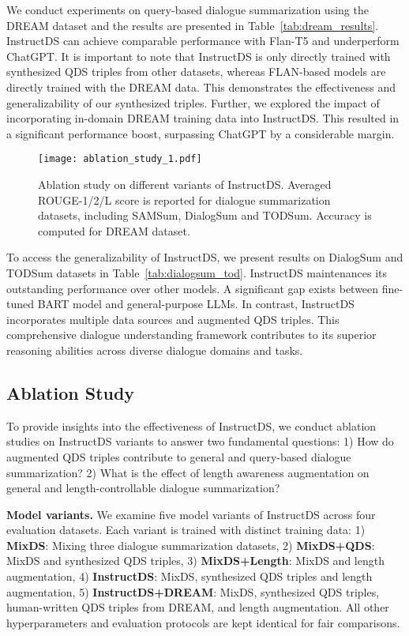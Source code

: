 \documentclass[11pt]{article}
\begin{document}
        We conduct experiments on query-based dialogue summarization using the DREAM dataset and the results are presented in Table~\ref{tab:dream_results}. InstructDS can achieve comparable performance with Flan-T5 and underperform ChatGPT. It is important to note that InstructDS is only directly trained with synthesized QDS triples from other datasets, whereas FLAN-based models are directly trained with the DREAM data. This demonstrates the effectiveness and generalizability of our synthesized triples. Further, we explored the impact of incorporating in-domain DREAM training data into InstructDS. This resulted in a significant performance boost, surpassing ChatGPT by a considerable margin.
        

\begin{figure*}[t]
        \centering
         \texttt{[image: ablation\_study\_1.pdf]}
        \caption{Ablation study on different variants of InstructDS. Averaged ROUGE-1/2/L score is reported for dialogue summarization datasets, including SAMSum, DialogSum and TODSum. Accuracy is computed for DREAM dataset.}
        \label{fig:ablation}
    \end{figure*}




        To access the generalizability of InstructDS, we present results on DialogSum and TODSum datasets in Table~\ref{tab:dialogsum_tod}. InstructDS maintenances its outstanding performance over other models.  
        A significant gap exists between fine-tuned BART model and general-purpose LLMs. In contrast, InstructDS incorporates multiple data sources and augmented QDS triples. This comprehensive dialogue understanding framework contributes to its superior reasoning abilities across diverse dialogue domains and tasks.


    \subsection{Ablation Study}
    \label{sec:ablation}

        To provide insights into the effectiveness of InstructDS, we conduct ablation studies on InstructDS variants to answer two fundamental questions: 1) How do augmented QDS triples contribute to general and query-based dialogue summarization? 2) What is the effect of length awareness augmentation on general and length-controllable dialogue summarization? 

        \textbf{Model variants.} We examine five model variants of InstructDS across four evaluation datasets. Each variant is trained with distinct training data: 1) \textbf{MixDS}: Mixing three dialogue summarization datasets, 2) \textbf{MixDS+QDS}: MixDS and synthesized QDS triples, 3) \textbf{MixDS+Length}: MixDS and length augmentation, 4) \textbf{InstructDS}: MixDS, synthesized QDS triples and length augmentation, 5) \textbf{InstructDS+DREAM}: MixDS, synthesized QDS triples, human-written  QDS triples from DREAM, and length augmentation. All other hyperparameters and evaluation protocols are kept identical for fair comparisons.
\end{document}
